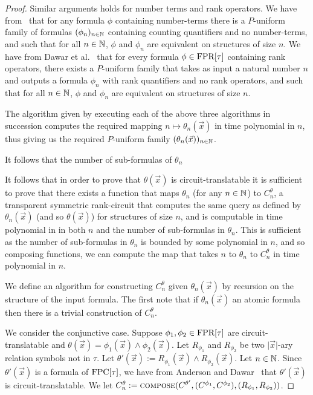 \documentclass[../paper.tex]{subfiles}
\begin{document}
\begin{proof}
  Similar arguments holds for number terms and rank operators. We have
  from~\cite{} that for any formula $\phi$ containing number-terms there is a
  $P$-uniform family of formulas $(\phi_n)_{n \in \mathbb{N}}$ containing counting
  quantifiers and no number-terms, and such that for all $n \in \mathbb{N}$, $\phi$
  and $\phi_n$ are equivalent on structures of size $n$. We have from Dawar et
  al.~\cite{Dawar09logicswith} that for every formula $\phi \in \text{\upshape FPR}[\tau]$
  containing rank operators, there exists a $P$-uniform family that takes as
  input a natural number $n$ and outputs a formula $\phi_n$ with rank
  quantifiers and no rank operators, and such that for all $n \in \mathbb{N}$, $\phi$
  and $\phi_n$ are equivalent on structures of size $n$.

  The algorithm given by executing each of the above three algorithms in
  succession computes the required mapping $n \mapsto \theta_n(\vec{x})$ in time
  polynomial in $n$, thus giving us the required $P$-uniform family
  $(\theta_n(\vec{x}))_{n \in \mathbb{N}}$.

  It follows that the number of sub-formulas of $\theta_n$

  It follows that in order to prove that $\theta(\vec{x})$ is
  circuit-translatable it is sufficient to prove that there exists a function
  that maps $\theta_n$ (for any $n \in \mathbb{N}$) to $C^{\theta}_n$, a transparent
  symmetric rank-circuit that computes the same query as defined by
  $\theta_n(\vec{x})$ (and so $\theta(\vec{x})$) for structures of size $n$, and
  is computable in time polynomial in in both $n$ and the number of sub-formulas
  in $\theta_n$. This is sufficient as the number of sub-formulas in $\theta_n$
  is bounded by some polynomial in $n$, and so composing functions, we can
  compute the map that takes $n$ to $\theta_n$ to $C^{\theta}_n$ in time
  polynomial in $n$.
  
  We define an algorithm for constructing $C^{\theta}_n$ given
  $\theta_n(\vec{x})$ by recursion on the structure of the input formula. The
  first note that if $\theta_n(\vec{x})$ an atomic formula then there is a
  trivial construction of $C^{\theta}_n$.

  We consider the conjunctive case. Suppose $\phi_1, \phi_2 \in \text{\upshape FPR}[\tau]$ are
  circuit-translatable and $\theta (\vec{x}) = \phi_1(\vec{x}) \land
  \phi_2(\vec{x})$. Let $R_{\phi_1}$ and $R_{\phi_2}$ be two $\vert \vec{x}
  \vert$-ary relation symbols not in $\tau$. Let $\theta' (\vec{x}) :=
  R_{\phi_1}(\vec{x}) \land R_{\phi_2}(\vec{x})$. Let $n \in \mathbb{N}$. Since
  $\theta'(\vec{x})$ is a formula of $\text{\upshape FPC}[\tau]$, we have from Anderson and
  Dawar~\cite{AndersonD17} that $\theta'(\vec{x})$ is circuit-translatable. We
  let $C^{\theta}_n := {\normalfont\textsc{compose}}(C^{\theta'}, (C^{\phi_1}, C^{\phi_2}),
  (R_{\phi_1}, R_{\phi_2}))$.


\end{proof}
\end{document}
